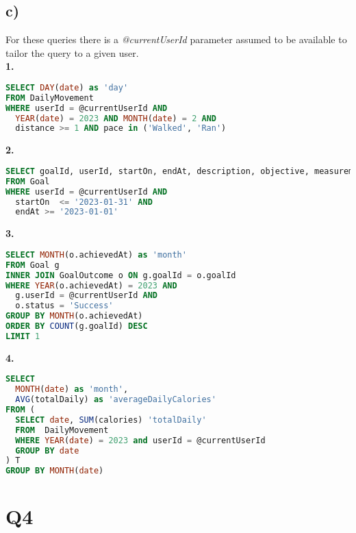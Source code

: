 \documentclass{article}
\begin{document}
\subsection*{\small c)}
For these queries there is a {\em @currentUserId} parameter assumed to be available to tailor the query to a given user. \\
\newline
\textbf{\small{1.}}
\begin{lstlisting}[language=sql]
SELECT DAY(date) as 'day'
FROM DailyMovement 
WHERE userId = @currentUserId AND 
  YEAR(date) = 2023 AND MONTH(date) = 2 AND 
  distance >= 1 AND pace in ('Walked', 'Ran')
\end{lstlisting}
\textbf{\small{2.}}
\begin{lstlisting}[language=sql]
SELECT goalId, userId, startOn, endAt, description, objective, measurement, target
FROM Goal 
WHERE userId = @currentUserId AND 
  startOn  <= '2023-01-31' AND 
  endAt >= '2023-01-01'
\end{lstlisting}
\textbf{\small{3.}}
\begin{lstlisting}[language=sql]
SELECT MONTH(o.achievedAt) as 'month'
FROM Goal g
INNER JOIN GoalOutcome o ON g.goalId = o.goalId
WHERE YEAR(o.achievedAt) = 2023 AND 
  g.userId = @currentUserId AND 
  o.status = 'Success'
GROUP BY MONTH(o.achievedAt)
ORDER BY COUNT(g.goalId) DESC
LIMIT 1
\end{lstlisting}
\textbf{\small{4.}}
\begin{lstlisting}[language=sql]
SELECT 
  MONTH(date) as 'month', 
  AVG(totalDaily) as 'averageDailyCalories'
FROM (
  SELECT date, SUM(calories) 'totalDaily'
  FROM  DailyMovement 
  WHERE YEAR(date) = 2023 and userId = @currentUserId
  GROUP BY date
) T
GROUP BY MONTH(date)
\end{lstlisting}

\pagebreak

\section*{Q4}
\end{document}
